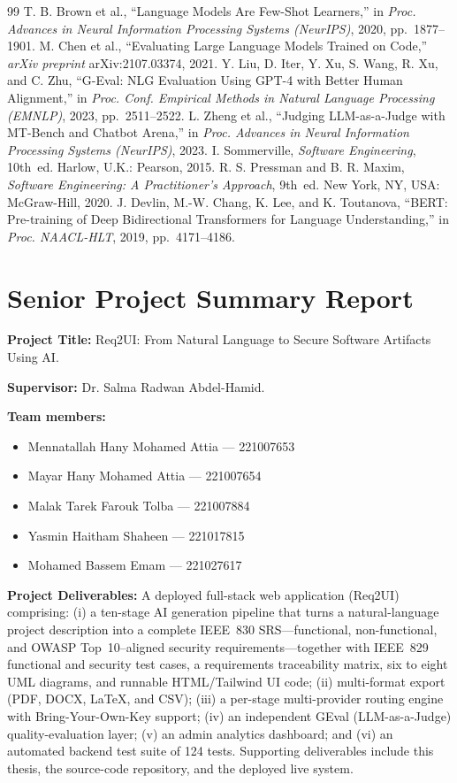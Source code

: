 \documentclass[12pt,a4paper,oneside]{report}
\begin{document}
\begin{thebibliography}{99}
 T. B. Brown et al., ``Language Models Are Few-Shot Learners,'' in \emph{Proc. Advances in Neural Information Processing Systems (NeurIPS)}, 2020, pp.~1877--1901.
 M. Chen et al., ``Evaluating Large Language Models Trained on Code,'' \emph{arXiv preprint} arXiv:2107.03374, 2021.
 Y. Liu, D. Iter, Y. Xu, S. Wang, R. Xu, and C. Zhu, ``G-Eval: NLG Evaluation Using GPT-4 with Better Human Alignment,'' in \emph{Proc. Conf. Empirical Methods in Natural Language Processing (EMNLP)}, 2023, pp.~2511--2522.
 L. Zheng et al., ``Judging LLM-as-a-Judge with MT-Bench and Chatbot Arena,'' in \emph{Proc. Advances in Neural Information Processing Systems (NeurIPS)}, 2023.
 I. Sommerville, \emph{Software Engineering}, 10th~ed. Harlow, U.K.: Pearson, 2015.
 R. S. Pressman and B. R. Maxim, \emph{Software Engineering: A Practitioner's Approach}, 9th~ed. New York, NY, USA: McGraw-Hill, 2020.
 J. Devlin, M.-W. Chang, K. Lee, and K. Toutanova, ``BERT: Pre-training of Deep Bidirectional Transformers for Language Understanding,'' in \emph{Proc. NAACL-HLT}, 2019, pp.~4171--4186.
\end{thebibliography}

\appendix
\chapter{Senior Project Summary Report}
\textbf{Project Title:} Req2UI: From Natural Language to Secure Software Artifacts Using AI.

\noindent\textbf{Supervisor:} Dr. Salma Radwan Abdel-Hamid.

\noindent\textbf{Team members:}
\begin{itemize}[leftmargin=*,nosep]
  \item Mennatallah Hany Mohamed Attia --- 221007653
  \item Mayar Hany Mohamed Attia --- 221007654
  \item Malak Tarek Farouk Tolba --- 221007884
  \item Yasmin Haitham Shaheen --- 221017815
  \item Mohamed Bassem Emam --- 221027617
\end{itemize}

\vspace{0.4em}
\noindent\textbf{Project Deliverables:} A deployed full-stack web application (Req2UI) comprising: (i) a ten-stage AI generation pipeline that turns a natural-language project description into a complete IEEE~830 SRS---functional, non-functional, and OWASP Top~10--aligned security requirements---together with IEEE~829 functional and security test cases, a requirements traceability matrix, six to eight UML diagrams, and runnable HTML/Tailwind UI code; (ii) multi-format export (PDF, DOCX, LaTeX, and CSV); (iii) a per-stage multi-provider routing engine with Bring-Your-Own-Key support; (iv) an independent GEval (LLM-as-a-Judge) quality-evaluation layer; (v) an admin analytics dashboard; and (vi) an automated backend test suite of 124 tests. Supporting deliverables include this thesis, the source-code repository, and the deployed live system.
\end{document}
